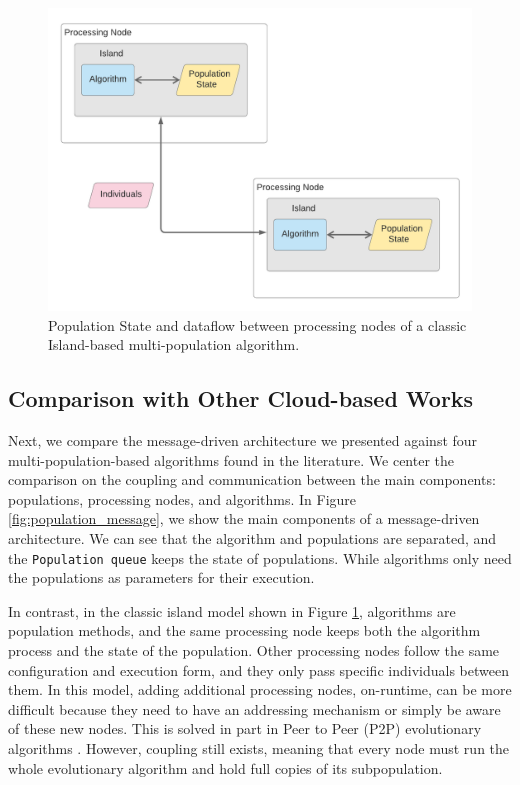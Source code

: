 \documentclass[review]{elsarticle}
\begin{document}
\begin{figure}[ht]
    \centering
    \includegraphics[width=\textwidth]{classicisland}
    \caption{ Population State and dataflow between processing nodes of a classic Island-based multi-population algorithm. }
    \label{fig:classicisland}
\end{figure}

\subsection{Comparison with Other Cloud-based Works} 
\label{comparison}

Next, we compare the message-driven architecture we presented against four
multi-population-based algorithms found in the literature. We center the
comparison on the coupling and communication between the main components:
populations, processing nodes, and algorithms.  In Figure \ref{fig:population_message}, we show the
main components of a message-driven architecture. We can see that the algorithm
and populations are separated, and the \texttt{Population queue} keeps the state
of populations. While algorithms only need the populations as parameters
for their execution.


In contrast, in the classic island model shown in Figure
\ref{fig:classicisland}, algorithms are  population methods, and the same processing
node keeps both the algorithm process and the state of the population.  Other
processing nodes follow the same configuration and execution form, and they
only pass specific individuals between them.  In this model, adding additional
processing nodes, on-runtime, can be more difficult because they need to have
an addressing mechanism or simply be aware of these new nodes. This is
solved in part in Peer to Peer (P2P) evolutionary algorithms
\cite{juanlu:europar}. However, coupling still exists, meaning that every
node must run the whole evolutionary algorithm and hold full copies of
its subpopulation. 
\end{document}
